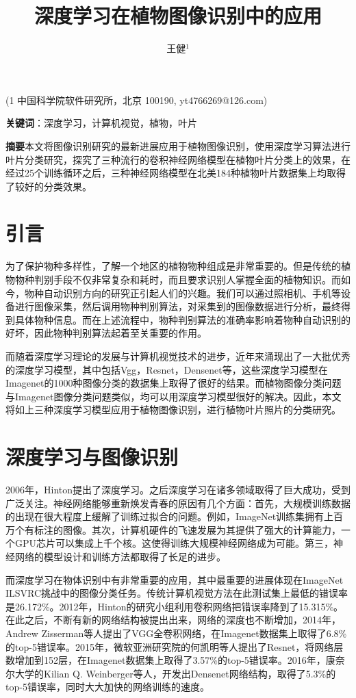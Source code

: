 \documentclass[a4paper]{ctexart} %
\title{深度学习在植物图像识别中的应用}
\author{王健$^1$}
\begin{document}
	\maketitle
	\begin{center}
		(1 中国科学院软件研究所，北京 100190, yt4766269@126.com)
	\end{center}
\textbf{关键词}：深度学习，计算机视觉，植物，叶片

\textbf{摘要}\quad 本文将图像识别研究的最新进展应用于植物图像识别，使用深度学习算法进行叶片分类研究，探究了三种流行的卷积神经网络模型在植物叶片分类上的效果，在经过25个训练循环之后，三种神经网络模型在北美184种植物叶片数据集上均取得了较好的分类效果。

\section*{引言}
为了保护物种多样性，了解一个地区的植物物种组成是非常重要的。但是传统的植物物种判别手段不仅非常复杂和耗时，而且要求识别人掌握全面的植物知识。而如今，物种自动识别方向的研究正引起人们的兴趣。我们可以通过照相机、手机等设备进行图像采集，然后调用物种判别算法，对采集到的图像数据进行分析，最终得到具体物种信息。而在上述流程中，物种判别算法的准确率影响着物种自动识别的好坏，因此物种判别算法起着至关重要的作用。

而随着深度学习理论的发展与计算机视觉技术的进步，近年来涌现出了一大批优秀的深度学习模型，其中包括Vgg\parencite{vgg}，Resnet\parencite{resnet}，Densenet\parencite{densenet}等，这些深度学习模型在Imagenet\parencite{imagenet}的1000种图像分类的数据集上取得了很好的结果。而植物图像分类问题与Imagenet图像分类问题类似，均可以用深度学习模型很好的解决。因此，本文将如上三种深度学习模型应用于植物图像识别，进行植物叶片照片的分类研究。

\section*{深度学习与图像识别}
2006年，Hinton提出了深度学习。之后深度学习在诸多领域取得了巨大成功，受到广泛关注。神经网络能够重新焕发青春的原因有几个方面：首先，大规模训练数据的出现在很大程度上缓解了训练过拟合的问题。例如，ImageNet训练集拥有上百万个有标注的图像。其次，计算机硬件的飞速发展为其提供了强大的计算能力，一个GPU芯片可以集成上千个核。这使得训练大规模神经网络成为可能。第三，神经网络的模型设计和训练方法都取得了长足的进步。

而深度学习在物体识别中有非常重要的应用，其中最重要的进展体现在ImageNet ILSVRC挑战中的图像分类任务。传统计算机视觉方法在此测试集上最低的错误率是26.172\%。2012年，Hinton的研究小组利用卷积网络把错误率降到了15.315\%。在此之后，不断有新的网络结构被提出出来，网络的深度也不断增加，2014年，Andrew Zisserman等人提出了VGG全卷积网络，在Imagenet数据集上取得了6.8\%的top-5错误率。2015年，微软亚洲研究院的何凯明等人提出了Resnet，将网络层数增加到152层，在Imagenet数据集上取得了3.57\%的top-5错误率。2016年，康奈尔大学的Kilian Q. Weinberger等人，开发出Densenet网络结构，取得了5.3\%的top-5错误率，同时大大加快的网络训练的速度。
\end{document}
